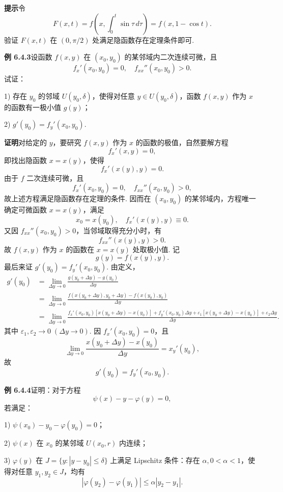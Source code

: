 \documentclass[UTF8,12pt,a4paper,fontset=fandol]{ctexart}
\begin{document}
\noindent\textbf{提示}\quad 令
\[
  F(x,t)=f\left(x,\int_0^t\sin\tau\,d\tau\right)
  =f(x,1-\cos t).
\]
验证 $F(x,t)$ 在 $(0,\pi/2)$ 处满足隐函数存在定理条件即可.

\noindent\textbf{例 6.4.3}\quad 设函数 $f(x,y)$ 在 $(x_0,y_0)$ 的某邻域内二次连续可微，且
\[
  f_x'(x_0,y_0)=0,\quad f_{xx}''(x_0,y_0)>0.
\]
试证：

1) 存在 $y_0$ 的邻域 $U(y_0,\delta)$，使得对任意 $y\in U(y_0,\delta)$，函数 $f(x,y)$ 作为 $x$ 的函数有一极小值 $g(y)$；

2) $g'(y_0)=f_y'(x_0,y_0)$.

\noindent\textbf{证明}\quad 对给定的 $y$，要研究 $f(x,y)$ 作为 $x$ 的函数的极值，自然要解方程
\[
  f_x'(x,y)=0,
\]
即找出隐函数 $x=x(y)$，使得
\[
  f_x'(x(y),y)=0.
\]
由于 $f$ 二次连续可微，且
\[
  f_x'(x_0,y_0)=0,\quad f_{xx}''(x_0,y_0)>0,
\]
故上述方程满足隐函数存在定理的条件. 因而在 $(x_0,y_0)$ 的某邻域内，方程唯一确定可微函数 $x=x(y)$，满足
\[
  x_0=x(y_0),\quad f_x'(x(y),y)\equiv0.
\]
又因 $f_{xx}''(x_0,y_0)>0$，当邻域取得充分小时，有
\[
  f_{xx}''(x(y),y)>0.
\]
故 $f(x,y)$ 作为 $x$ 的函数在 $x=x(y)$ 处取极小值. 记
\[
  g(y)=f(x(y),y).
\]
最后来证 $g'(y_0)=f_y'(x_0,y_0)$. 由定义，
\[
\begin{aligned}
  g'(y_0)
  &=
  \lim_{\Delta y\to0}
  \frac{g(y_0+\Delta y)-g(y_0)}{\Delta y}       \\
  &=
  \lim_{\Delta y\to0}
  \frac{
    f(x(y_0+\Delta y),y_0+\Delta y)-f(x(y_0),y_0)
  }{\Delta y}                                  \\
  &=
  \lim_{\Delta y\to0}
  \frac{
    f_x'(x_0,y_0)[x(y_0+\Delta y)-x(y_0)]
    +f_y'(x_0,y_0)\Delta y
    +\varepsilon_1[x(y_0+\Delta y)-x(y_0)]
    +\varepsilon_2\Delta y
  }{\Delta y}.
\end{aligned}
\]
其中 $\varepsilon_1,\varepsilon_2\to0\;(\Delta y\to0)$. 因 $f_x'(x_0,y_0)=0$，且
\[
  \lim_{\Delta y\to0}
  \frac{x(y_0+\Delta y)-x(y_0)}{\Delta y}
  =x_y'(y_0),
\]
故
\[
  g'(y_0)=f_y'(x_0,y_0).
\]

\noindent\textbf{例 6.4.4}\quad 证明：对于方程
\[
  \psi(x)-y-\varphi(y)=0,
\]
若满足：

1) $\psi(x_0)-y_0-\varphi(y_0)=0$；

2) $\psi(x)$ 在 $x_0$ 的某邻域 $U(x_0,r)$ 内连续；

3) $\varphi(y)$ 在 $J=\{y:|y-y_0|\le\delta\}$ 上满足 Lipschitz 条件：存在 $\alpha,0<\alpha<1$，使得对任意 $y_1,y_2\in J$，均有
\begin{equation}
  |\varphi(y_2)-\varphi(y_1)|\le\alpha|y_2-y_1|.
\end{equation}
\end{document}
